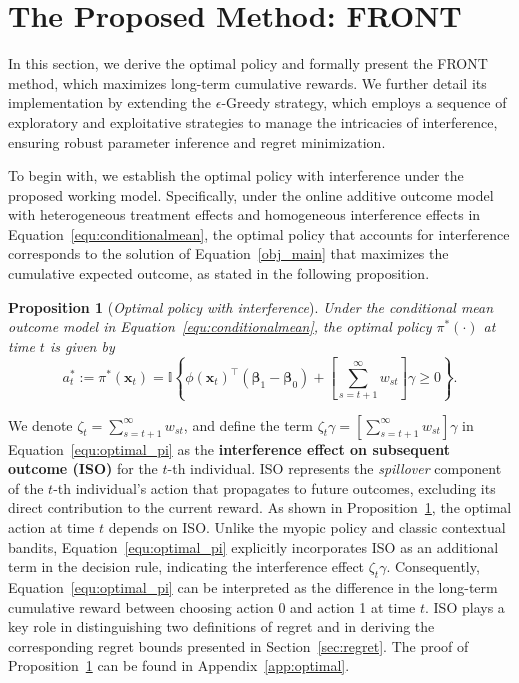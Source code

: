\documentclass[12pt]{article}
\newtheorem{proposition}[theorem]{Proposition}
\begin{document}
\section{The Proposed Method: FRONT}
\label{sec:FRONT}

In this section, we derive the optimal policy and formally present the FRONT method, which maximizes long-term cumulative rewards. We further detail its implementation by extending the $\epsilon$-Greedy strategy, which employs a sequence of exploratory and exploitative strategies to manage the intricacies of interference, ensuring robust parameter inference and regret minimization. 

To begin with, we establish the optimal policy with interference under the proposed working model. Specifically, under the online additive outcome model with heterogeneous treatment effects and homogeneous interference effects in Equation~\eqref{equ:conditionalmean}, the optimal policy that accounts for interference corresponds to the solution of Equation~\eqref{obj_main} that maximizes the cumulative expected outcome, as stated in the following proposition.

\begin{proposition}[{\emph{Optimal policy with interference}}]
\label{prop:optimal}
     Under the conditional mean outcome model in Equation~\eqref{equ:conditionalmean}, the optimal policy $\pi^\ast(\cdot)$ at time $t$ is given by 
    \begin{equation}
    \label{equ:optimal_pi}
        a_t^\ast := \pi^\ast(\bm{x}_t) = \mathbb{I}\left\{\phi(\bm{x}_t)^{\top} (\bm{\beta}_1 - \bm{\beta}_0) + \left[\sum_{s=t+1}^{\infty} w_{st}\right] \gamma \ge 0 \right\}.
    \end{equation}
\end{proposition}


We denote $\zeta_t = \sum_{s=t+1}^{\infty} w_{st}$, and define the term $\zeta_t \gamma = \left[\sum_{s=t+1}^{\infty} w_{st}\right] \gamma$ in Equation~\eqref{equ:optimal_pi} as the \textbf{interference effect on subsequent outcome (ISO)} for the $t$-th individual. 
ISO represents the \textit{spillover} component of the $t$-th individual’s action that propagates to future outcomes, excluding its direct contribution to the current reward. As shown in Proposition~\ref{prop:optimal}, the optimal action at time $t$ depends on ISO. Unlike the myopic policy and classic contextual bandits, Equation~\eqref{equ:optimal_pi} explicitly incorporates ISO as an additional term in the decision rule, indicating the interference effect $\zeta_t\gamma$. Consequently, Equation~\eqref{equ:optimal_pi} can be interpreted as the difference in the long-term cumulative reward between choosing action 0 and action 1 at time $t$. ISO plays a key role in distinguishing two definitions of regret and in deriving the corresponding regret bounds presented in Section~\ref{sec:regret}. The proof of Proposition~\ref{prop:optimal} can be found in Appendix~\ref{app:optimal}.
\end{document}
